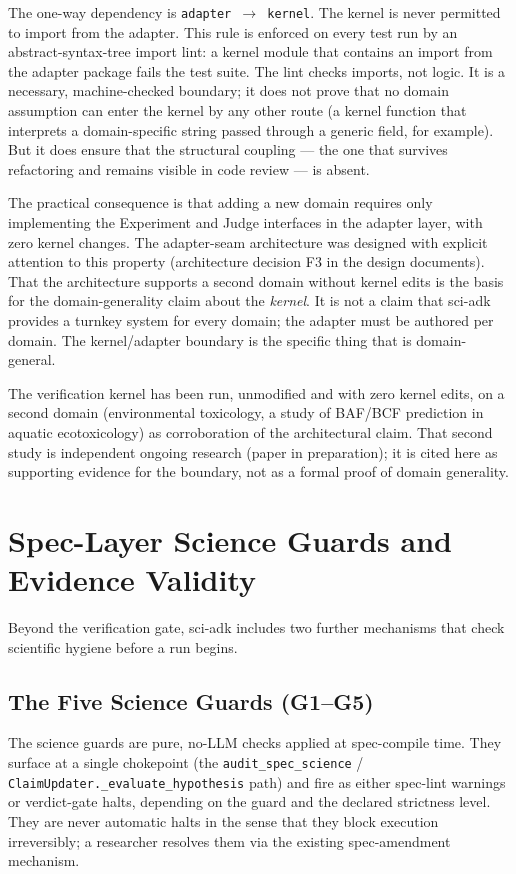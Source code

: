 \documentclass[11pt]{article}
\begin{document}
The one-way dependency is \texttt{adapter $\rightarrow$ kernel}. The kernel is never permitted to import from the adapter. This rule is enforced on every test run by an abstract-syntax-tree import lint: a kernel module that contains an import from the adapter package fails the test suite. The lint checks imports, not logic. It is a necessary, machine-checked boundary; it does not prove that no domain assumption can enter the kernel by any other route (a kernel function that interprets a domain-specific string passed through a generic field, for example). But it does ensure that the structural coupling --- the one that survives refactoring and remains visible in code review --- is absent.

The practical consequence is that adding a new domain requires only implementing the Experiment and Judge interfaces in the adapter layer, with zero kernel changes. The adapter-seam architecture was designed with explicit attention to this property (architecture decision F3 in the design documents). That the architecture supports a second domain without kernel edits is the basis for the domain-generality claim about the \textit{kernel}. It is not a claim that sci-adk provides a turnkey system for every domain; the adapter must be authored per domain. The kernel/adapter boundary is the specific thing that is domain-general.

The verification kernel has been run, unmodified and with zero kernel edits, on a second domain (environmental toxicology, a study of BAF/BCF prediction in aquatic ecotoxicology) as corroboration of the architectural claim. That second study is independent ongoing research (paper in preparation); it is cited here as supporting evidence for the boundary, not as a formal proof of domain generality.

\section{Spec-Layer Science Guards and Evidence Validity}

Beyond the verification gate, sci-adk includes two further mechanisms that check scientific hygiene before a run begins.

\subsection{The Five Science Guards (G1--G5)}

The science guards are pure, no-LLM checks applied at spec-compile time. They surface at a single chokepoint (the \texttt{audit\_spec\_science} / \texttt{ClaimUpdater.\_evaluate\_hypothesis} path) and fire as either spec-lint warnings or verdict-gate halts, depending on the guard and the declared strictness level. They are never automatic halts in the sense that they block execution irreversibly; a researcher resolves them via the existing spec-amendment mechanism.
\end{document}
